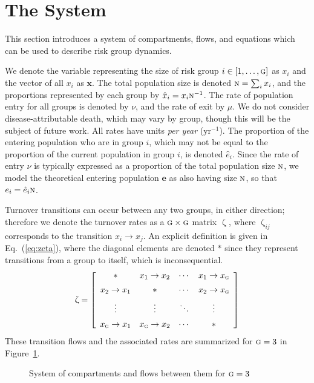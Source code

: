\documentclass{article}
\numberwithin{equation}{section}
\renewcommand{\zeta}{\upzeta}
\newcommand{\x}{\hat{x}}
\newcommand{\e}{\hat{e}}
\newcommand{\N}{\textsc{n}}
\newcommand{\G}{\textsc{g}}
\begin{document}
\section{The System}\label{s:system}
This section introduces a system of compartments, flows, and equations
which can be used to describe risk group dynamics.
\par
We denote the variable representing
the size of risk group $i \in [1, \dots, \G]$ as $x_i$
and the vector of all $x_i$ as $\bm{x}$.
The total population size is denoted $\N = \sum_i x_i$,
and the proportions represented by each group by $\x_i = x_i \N^{-1}$.
The rate of population entry for all groups is denoted by $\nu$, and
the rate of exit by $\mu$.
We do not consider disease-attributable death, which may vary by group,
though this will be the subject of future work.
All rates have units \textit{per year} ($\mathrm{yr}^{-1}$).
The proportion of the entering population who are in group $i$,
which may not be equal to the proportion of the current population in group $i$,
is denoted $\e_i$.
Since the rate of entry $\nu$ is typically expressed as
a proportion of the total population size $\N$,
we model the theoretical entering population $\bm{e}$ as also having size $\N$,
so that $e_i = \e_i \N$.
\par
Turnover transitions can occur between any two groups, in either direction;
therefore we denote the turnover rates as a $\G \times \G$ matrix $\zeta$,
where $\zeta_{ij}$ corresponds to the transition $x_i \rightarrow x_j$.
An explicit definition is given in Eq.~(\ref{eq:zeta}),
where the diagonal elements are denoted $*$ since they represent
transitions from a group to itself, which is inconsequential.
\begin{equation}\label{eq:zeta}
\zeta = \left[\begin{array}{cccc}
         *           & x_1  \rightarrow x_2 & \cdots & x_1 \rightarrow x_\G \\[0.5em]
x_2  \rightarrow x_1 &          *           & \cdots & x_2 \rightarrow x_\G \\[0.5em]
      \vdots         &       \vdots         & \ddots &       \vdots         \\[0.5em]
x_\G \rightarrow x_1 & x_\G \rightarrow x_2 & \cdots &          *
\end{array}\right]
\end{equation}
These transition flows and the associated rates are summarized for $\G = 3$ in Figure~\ref{fig:system}.
\begin{figure}[h]
  \centering
  \caption{System of compartments and flows between them for $\G = 3$}
  \label{fig:system}
\end{figure}
\end{document}
